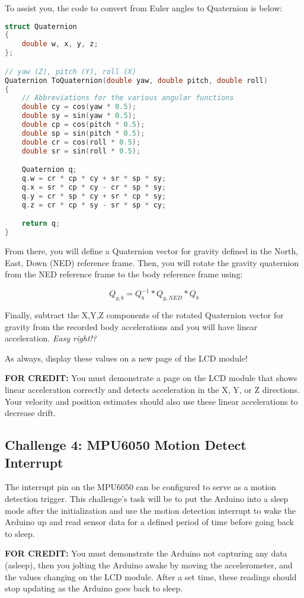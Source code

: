     To assist you, the code to convert from Euler angles to Quaternion is below:
    \begin{lstlisting}[linewidth=1.5\textwidth, language=C++]
struct Quaternion
{
    double w, x, y, z;
};

// yaw (Z), pitch (Y), roll (X)
Quaternion ToQuaternion(double yaw, double pitch, double roll)
{
    // Abbreviations for the various angular functions
    double cy = cos(yaw * 0.5);
    double sy = sin(yaw * 0.5);
    double cp = cos(pitch * 0.5);
    double sp = sin(pitch * 0.5);
    double cr = cos(roll * 0.5);
    double sr = sin(roll * 0.5);

    Quaternion q;
    q.w = cr * cp * cy + sr * sp * sy;
    q.x = sr * cp * cy - cr * sp * sy;
    q.y = cr * sp * cy + sr * cp * sy;
    q.z = cr * cp * sy - sr * sp * cy;

    return q;
}
    \end{lstlisting}

    From there, you will define a Quaternion vector for gravity defined in the North, East, Down (NED) reference frame.
    Then, you will rotate the gravity quaternion from the NED reference frame to the body reference frame using:
    
    \begin{equation*}
        Q_{g,b} = Q_b^{-1} * Q_{g,NED} * Q_b
    \end{equation*}

    Finally, subtract the X,Y,Z components of the rotated Quaternion vector for gravity from the recorded body accelerations and you will have linear acceleration. \emph{Easy right!?}
    
    As always, display these values on a new page of the LCD module!

    \textbf{FOR CREDIT:} You must demonstrate a page on the LCD module that shows linear acceleration correctly and detects acceleration in the X, Y, or Z directions.
    Your velocity and position estimates should also use these linear accelerations to decrease drift.
    
    \subsection*{Challenge 4: MPU6050 Motion Detect Interrupt}
    The interrupt pin on the MPU6050 can be configured to serve as a motion detection trigger.
    This challenge's task will be to put the Arduino into a sleep mode after the initialization and use the motion detection interrupt to wake the Arduino up and read sensor data for a defined period of time before going back to sleep.

    \textbf{FOR CREDIT:} You must demonstrate the Arduino not capturing any data (asleep), then you jolting the Arduino awake by moving the accelerometer, and the values changing on the LCD module.
    After a set time, these readings should stop updating as the Arduino goes back to sleep.
